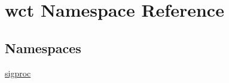 \hypertarget{namespacewct}{}\section{wct Namespace Reference}
\label{namespacewct}
\subsection*{Namespaces}
\begin{DoxyCompactItemize}
\item 
 \hyperlink{namespacewct_1_1sigproc}{sigproc}
\end{DoxyCompactItemize}
